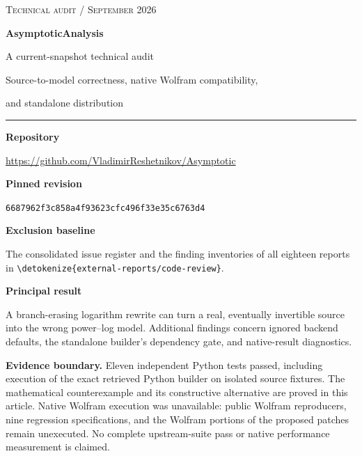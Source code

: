 \documentclass[11pt,a4paper]{article}
\newcommand{\wl}[1]{\texttt{\expandafter\nolinkurl\expandafter{\detokenize{#1}}}}
\begin{document}
\begin{titlepage}
\vspace*{13mm}
{\small\scshape Technical audit \quad /  September 2026}\par
\vspace{12mm}
{\Huge\bfseries\color{ink} AsymptoticAnalysis}\par
\vspace{4mm}
{\LARGE A current-snapshot technical audit}\par
\vspace{9mm}
{\large Source-to-model correctness, native Wolfram compatibility,\par
and standalone distribution}\par
\vspace{15mm}
\rule{\textwidth}{0.5pt}
\vspace{4mm}
\textbf{Repository}\par
\url{https://github.com/VladimirReshetnikov/Asymptotic}\par
\vspace{3mm}
\textbf{Pinned revision}\par
\texttt{6687962f3c858a4f93623cfc496f33e35c6763d4}\par
\vspace{3mm}
\textbf{Exclusion baseline}\par
The consolidated issue register and the finding inventories of all eighteen
reports in \wl{external-reports/code-review}.\par
\vspace{8mm}
\textbf{Principal result}\par
A branch-erasing logarithm rewrite can turn a real, eventually invertible source
into the wrong power--log model. Additional findings concern ignored backend
defaults, the standalone builder's dependency gate, and native-result diagnostics.
\vfill
\begin{minipage}{0.97\textwidth}
\small
\textbf{Evidence boundary.} Eleven independent Python tests passed, including
execution of the exact retrieved Python builder on isolated source fixtures.
The mathematical counterexample and its constructive alternative are proved in
this article. Native Wolfram execution was unavailable: public Wolfram
reproducers, nine regression specifications, and the Wolfram portions of the
proposed patches remain unexecuted. No complete upstream-suite pass or native
performance measurement is claimed.
\end{minipage}
\end{titlepage}
\tableofcontents
\newpage
\end{document}
